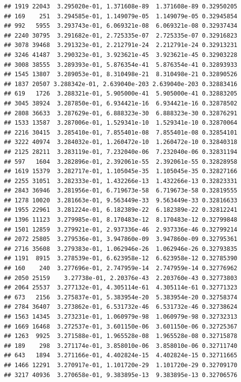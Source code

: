 \documentclass[
]{article}
\begin{document}
\begin{verbatim}
## 1919 22043  3.295020e-01, 1.371608e-89  1.371608e-89 0.32950205
## 169    251  3.294585e-01, 1.149079e-05  1.149079e-05 0.32945854
## 992   5955  3.293743e-01, 6.069321e-08  6.069321e-08 0.32937434
## 2240 30795  3.291682e-01, 2.725335e-07  2.725335e-07 0.32916823
## 3078 39468  3.291323e-01, 2.212791e-24  2.212791e-24 0.32913231
## 3246 41487  3.290323e-01, 3.923621e-45  3.923621e-45 0.32903228
## 3008 38555  3.289393e-01, 5.876354e-41  5.876354e-41 0.32893933
## 1545 13807  3.289053e-01, 8.310498e-21  8.310498e-21 0.32890526
## 1837 20507 3.288342e-01, 2.639040e-203 2.639040e-203 0.32883416
## 619   1726  3.288321e-01, 5.905000e-41  5.905000e-41 0.32883205
## 3045 38924  3.287850e-01, 6.934421e-16  6.934421e-16 0.32878502
## 2808 36633  3.287629e-01, 6.888323e-30  6.888323e-30 0.32876291
## 1533 13587  3.287006e-01, 1.529341e-10  1.529341e-10 0.32870064
## 2216 30415  3.285410e-01, 7.855401e-08  7.855401e-08 0.32854101
## 3222 40974  3.284032e-01, 1.260472e-10  1.260472e-10 0.32840318
## 2125 28211  3.283119e-01, 7.232040e-06  7.232040e-06 0.32831194
## 597   1604  3.282896e-01, 2.392061e-55  2.392061e-55 0.32828958
## 1619 15379  3.282717e-01, 1.105045e-35  1.105045e-35 0.32827166
## 2255 31051  3.282333e-01, 1.432266e-13  1.432266e-13 0.32823331
## 2843 36946  3.281956e-01, 6.719673e-58  6.719673e-58 0.32819555
## 1278 10020  3.281663e-01, 9.563449e-33  9.563449e-33 0.32816633
## 1955 22961  3.281224e-01, 6.182389e-22  6.182389e-22 0.32812241
## 1396 11123  3.279985e-01, 8.170483e-12  8.170483e-12 0.32799848
## 1501 12859  3.279921e-01, 2.937336e-46  2.937336e-46 0.32799214
## 2072 25805  3.279536e-01, 3.947860e-09  3.947860e-09 0.32795361
## 2716 35608  3.279383e-01, 1.062946e-26  1.062946e-26 0.32793835
## 1191  8915  3.278539e-01, 6.623958e-12  6.623958e-12 0.32785390
## 160    240  3.277696e-01, 2.747959e-14  2.747959e-14 0.32776962
## 2050 25159    3.27738e-01, 2.20376e-43  2.203760e-43 0.32773803
## 2064 25537  3.277132e-01, 4.305114e-61  4.305114e-61 0.32771323
## 673   2156  3.275837e-01, 5.383954e-20  5.383954e-20 0.32758374
## 2784 36407  3.273862e-01, 6.531732e-46  6.531732e-46 0.32738624
## 1563 14345  3.273231e-01, 1.060979e-98  1.060979e-98 0.32732313
## 1669 16468  3.272537e-01, 3.601150e-06  3.601150e-06 0.32725367
## 1263  9925  3.271588e-01, 1.965528e-08  1.965528e-08 0.32715878
## 189    298  3.271174e-01, 3.858010e-06  3.858010e-06 0.32711740
## 643   1894  3.271166e-01, 4.402824e-15  4.402824e-15 0.32711665
## 1466 12291  3.270917e-01, 1.101720e-29  1.101720e-29 0.32709170
## 3217 40936  3.270658e-01, 9.383895e-13  9.383895e-13 0.32706576

\end{verbatim}
\end{document}
